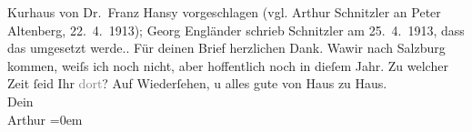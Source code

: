 \begin{ledgroupsized}[t]{13cm}
{{{                     Kurhaus von Dr. Franz Hansy vorgeschlagen (vgl. Arthur Schnitzler an Peter Altenberg, 22. 4. 1913); Georg Engländer schrieb Schnitzler am 25. 4. 1913, dass das umgesetzt werde.}}}\label{K_L02132_1h}.\pend
           \pstart
           Für deinen Brief herzlichen Dank. Wa{\geminationn}{\pb}wir nach Salzburg kommen, weiſs ich noch nicht, aber
               hoffentlich noch in dieſem Jahr. Zu welcher Zeit ſeid Ihr
               \textcolor{gray}{dort}?\pend
           \pstart
           Auf Wiederſehen, u alles gute von Haus zu Haus.{\\[\baselineskip]}Dein{\\[\baselineskip]}\spacefill\mbox{Arthur}\pend
           \leftskip=0em{}
         
         \endnumbering{}\end{ledgroupsized}  \newcommand{\dateiname}{L02132}\newcommand{\titel}{Arthur Schnitzler an Hermann Bahr, 2[5]. 4. 1913}\newcommand{\editorInnen}{ Kurt Ifkovits,  Martin Anton Müller}
      